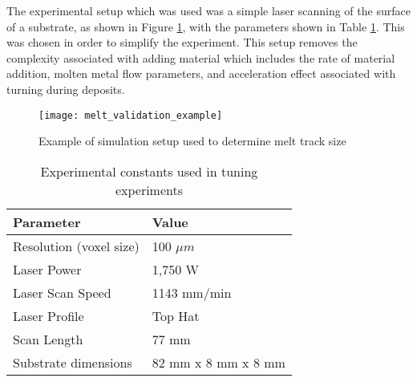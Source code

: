 The experimental setup which was used was a simple laser scanning of the surface of a substrate, as shown in Figure \ref{fig:melt_validation_example}, with the parameters shown in Table \ref{tab:exp_constants}.  This was chosen in order to simplify the experiment.  This setup removes the complexity associated with adding material which includes the rate of material addition, molten metal flow parameters, and acceleration effect associated with turning during deposits.
\begin{figure}[!htb]
	\centering
	\texttt{[image: melt\_validation\_example]}
	\caption{Example of simulation setup used to determine melt track size}
	\label{fig:melt_validation_example}
\end{figure}
\begin{table}[!htb]
	\centering
	\caption{Experimental constants used in tuning experiments}
	\label{tab:exp_constants}
	\begin{tabular}{|l|l|} \hline
		Parameter & Value \\ \hline
		Resolution (voxel size) & 100 $\mu m$ \\ \hline
		Laser Power & 1,750 W \\ \hline
		Laser Scan Speed & 1143 mm/min \\ \hline
		Laser Profile & Top Hat \\ \hline
		Scan Length & 77 mm \\ \hline
		Substrate dimensions & 82 mm x 8 mm x 8 mm \\ \hline
	\end{tabular}
\end{table}


